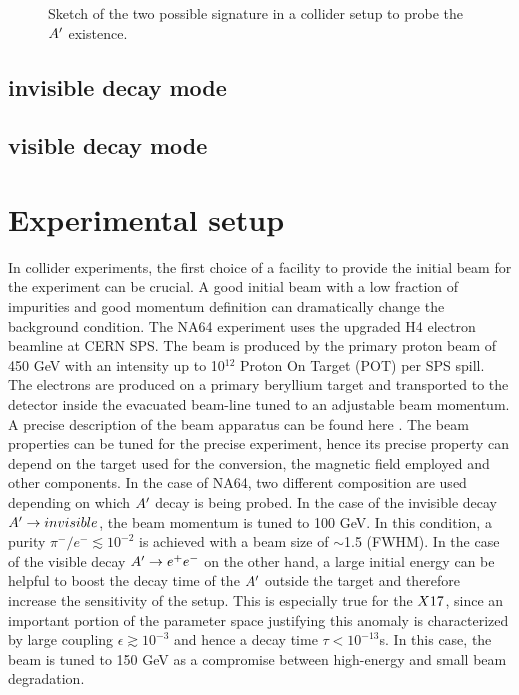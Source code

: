 \begin{figure}[bth!]
  \centering
  
  \caption[two signature sketch]{Sketch of the two possible signature in a collider setup to probe the $A'$ existence.}
  \label{fig:two-signature}
\end{figure}

\subsection{invisible decay mode}
\label{chapter2:sec:experimental-technique-invis}

\subsection{visible decay mode}
\label{chapter2:sec:experimental-technique-vis}

\section{Experimental setup}
\label{chapter2:sec:experimental-setup}

In collider experiments, the first choice of a facility to provide the initial beam for the experiment can be crucial. A good initial beam with a low fraction of impurities and good momentum definition can dramatically change the background condition. The NA64 experiment uses the upgraded H4 electron beamline at CERN SPS. The beam is produced by the primary proton beam of 450 \si{\giga\electronvolt} with an intensity up to 10$^{12}$ Proton On Target (POT) per SPS spill. The electrons are produced on a primary beryllium target and transported to the detector inside the evacuated beam-line tuned to an adjustable beam momentum. A precise description of the beam apparatus can be found here \cite{sps-beamline,h4-beamline}. The beam properties can be tuned for the precise experiment, hence its precise property can depend on the target used for the conversion, the magnetic field employed and other components. In the case of NA64, two different composition are used depending on which $A'$ decay is being probed. In the case of the invisible decay $A'\to invisible$, the beam momentum is tuned to 100 \si{\giga\electronvolt}. In this condition, a purity $\pi^-/e^- \lesssim 10^{-2}$ is achieved with a beam size of $\sim$1.5\si{\centimeter} (FWHM). In the case of the visible decay $A' \to e^+e^-$ on the other hand, a large initial energy can be helpful to boost the decay time of the $A'$ outside the target and therefore increase the sensitivity of the setup. This is especially true for the $X17$, since an important portion of the parameter space justifying this anomaly is characterized by large coupling $\epsilon \gtrsim 10^{-3}$ and hence a decay time $\tau \lt 10^{-13}$\si{s}. In this case, the beam is tuned to 150 \si{\giga\electronvolt} as a compromise between high-energy and small beam degradation.

